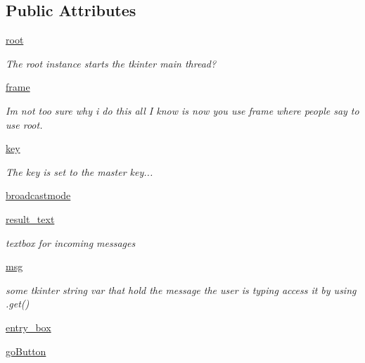 \subsection*{Public Attributes}
\begin{DoxyCompactItemize}
\item 
\hyperlink{classgui_version_1_1_chat_client_g_u_i_afec7497b20c1d133c5c026c9625a1691}{root}
\begin{DoxyCompactList}\small\item\em The root instance starts the tkinter main thread? \end{DoxyCompactList}\item 
\hyperlink{classgui_version_1_1_chat_client_g_u_i_a7809572437bc7888072cb612990da273}{frame}
\begin{DoxyCompactList}\small\item\em Im not too sure why i do this all I know is now you use frame where people say to use root. \end{DoxyCompactList}\item 
\hyperlink{classgui_version_1_1_chat_client_g_u_i_afe7983bc0c4a2f71030e992caca57b43}{key}
\begin{DoxyCompactList}\small\item\em The key is set to the master key... \end{DoxyCompactList}\item 
\hyperlink{classgui_version_1_1_chat_client_g_u_i_a24c3049b3a6f498d56685eef5405baf6}{broadcastmode}
\item 
\hyperlink{classgui_version_1_1_chat_client_g_u_i_aed7ce16822dd2da856987bb7dbca00f7}{result\+\_\+text}
\begin{DoxyCompactList}\small\item\em textbox for incoming messages \end{DoxyCompactList}\item 
\hyperlink{classgui_version_1_1_chat_client_g_u_i_a44a52021282a7dc6c04aa10b77d829e9}{msg}
\begin{DoxyCompactList}\small\item\em some tkinter string var that hold the message the user is typing access it by using .get() \end{DoxyCompactList}\item 
\hyperlink{classgui_version_1_1_chat_client_g_u_i_a4436c621e5f3c806218c2756edf488f7}{entry\+\_\+box}
\item 
\hyperlink{classgui_version_1_1_chat_client_g_u_i_a5a09ecaf8a2c39309f7b7acdea272bc5}{go\+Button}
\item 

\end{DoxyCompactItemize}
